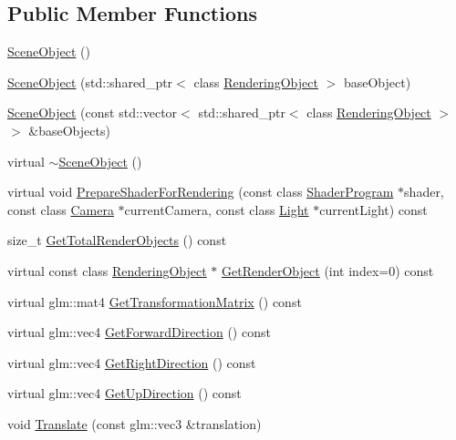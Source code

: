 \subsection*{Public Member Functions}
\begin{DoxyCompactItemize}
\item 
\hyperlink{class_scene_object_a0d268d96d77dbeb45b07a6442e2f4d0d}{Scene\+Object} ()
\item 
\hyperlink{class_scene_object_a9dd76f946c8e0743bed57f9499773fbd}{Scene\+Object} (std\+::shared\+\_\+ptr$<$ class \hyperlink{class_rendering_object}{Rendering\+Object} $>$ base\+Object)
\item 
\hyperlink{class_scene_object_aa89b21b4732296d196a76d1785aee02c}{Scene\+Object} (const std\+::vector$<$ std\+::shared\+\_\+ptr$<$ class \hyperlink{class_rendering_object}{Rendering\+Object} $>$$>$ \&base\+Objects)
\item 
virtual \hyperlink{class_scene_object_ab258d6b94e982d5ae71ad4d7652381f4}{$\sim$\+Scene\+Object} ()
\item 
virtual void \hyperlink{class_scene_object_a5ab56b2b2997f96aed97415185beec41}{Prepare\+Shader\+For\+Rendering} (const class \hyperlink{class_shader_program}{Shader\+Program} $\ast$shader, const class \hyperlink{class_camera}{Camera} $\ast$current\+Camera, const class \hyperlink{class_light}{Light} $\ast$current\+Light) const 
\item 
size\+\_\+t \hyperlink{class_scene_object_ac2873f8a613bd4b161a1ea605888d6e7}{Get\+Total\+Render\+Objects} () const 
\item 
virtual const class \hyperlink{class_rendering_object}{Rendering\+Object} $\ast$ \hyperlink{class_scene_object_a29b15adf1faeceef0b3f5b1c36e34d5c}{Get\+Render\+Object} (int index=0) const 
\item 
virtual glm\+::mat4 \hyperlink{class_scene_object_aea26bf44c609cc4d733a811a55e442e2}{Get\+Transformation\+Matrix} () const 
\item 
virtual glm\+::vec4 \hyperlink{class_scene_object_abdf46a2b05799382e9cb3894d5da03ea}{Get\+Forward\+Direction} () const 
\item 
virtual glm\+::vec4 \hyperlink{class_scene_object_ab96fed2fb77d81c8d1c2735fbf2a998a}{Get\+Right\+Direction} () const 
\item 
virtual glm\+::vec4 \hyperlink{class_scene_object_ad8828989c033b25c996cf025d7e86f54}{Get\+Up\+Direction} () const 
\item 
void \hyperlink{class_scene_object_a04868377580069b0ee9d202bdb1b7159}{Translate} (const glm\+::vec3 \&translation)
$$
\end{DoxyCompactItemize}
